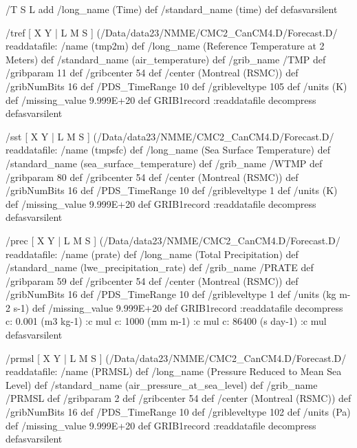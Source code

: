 \begin{ingrid}
/T { S L add
/long_name (Time) def
/standard_name (time) def } defasvarsilent

/tref {
[ X Y | L M S ] (/Data/data23/NMME/CMC2_CanCM4.D/Forecast.D/%
readdatafile: 
/name (tmp2m) def
/long_name (Reference Temperature at 2 Meters) def
/standard_name (air_temperature) def
/grib_name /TMP def
/gribparam 11 def
/gribcenter 54 def
/center (Montreal (RSMC)) def
/gribNumBits 16 def
/PDS_TimeRange 10 def
/gribleveltype 105 def
/units (K) def
/missing_value 9.999E+20 def
GRIB1record
:readdatafile decompress
} defasvarsilent

/sst {
[ X Y | L M S ] (/Data/data23/NMME/CMC2_CanCM4.D/Forecast.D/%
readdatafile: 
/name (tmpsfc) def
/long_name (Sea Surface Temperature) def
/standard_name (sea_surface_temperature) def
/grib_name /WTMP def
/gribparam 80 def
/gribcenter 54 def
/center (Montreal (RSMC)) def
/gribNumBits 16 def
/PDS_TimeRange 10 def
/gribleveltype 1 def
/units (K) def
/missing_value 9.999E+20 def
GRIB1record
:readdatafile decompress
} defasvarsilent

/prec {
[ X Y | L M S ] (/Data/data23/NMME/CMC2_CanCM4.D/Forecast.D/%
readdatafile: 
/name (prate) def
/long_name (Total Precipitation) def
/standard_name (lwe_precipitation_rate) def
/grib_name /PRATE def
/gribparam 59 def
/gribcenter 54 def
/center (Montreal (RSMC)) def
/gribNumBits 16 def
/PDS_TimeRange 10 def
/gribleveltype 1 def
/units (kg m-2 s-1) def
/missing_value 9.999E+20 def
GRIB1record
:readdatafile decompress
  c:
   0.001 (m3 kg-1) :c
   mul
  c:
   1000 (mm m-1) :c
   mul
  c:
   86400 (s day-1) :c
   mul
} defasvarsilent

/prmsl {
[ X Y | L M S ] (/Data/data23/NMME/CMC2_CanCM4.D/Forecast.D/%
readdatafile: 
/name (PRMSL) def
/long_name (Pressure Reduced to Mean Sea Level) def
/standard_name (air_pressure_at_sea_level) def
/grib_name /PRMSL def
/gribparam 2 def
/gribcenter 54 def
/center (Montreal (RSMC)) def
/gribNumBits 16 def
/PDS_TimeRange 10 def
/gribleveltype 102 def
/units (Pa) def
/missing_value 9.999E+20 def
GRIB1record
:readdatafile decompress
} defasvarsilent


\end{ingrid}

